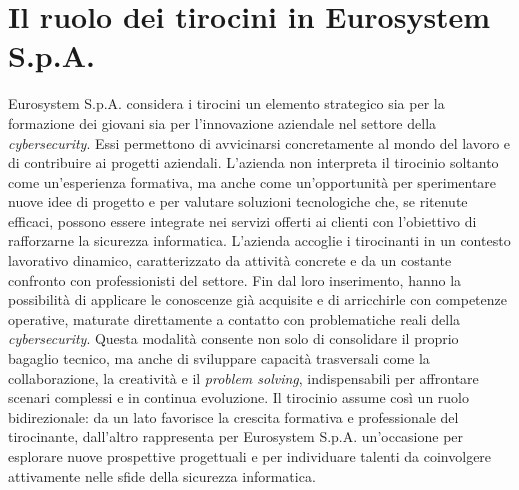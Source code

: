 \section{Il ruolo dei tirocini in Eurosystem S.p.A.}
Eurosystem S.p.A. considera i tirocini un elemento strategico sia per la formazione dei giovani sia per l'innovazione aziendale nel settore della \textit{cybersecurity}.  
Essi permettono di avvicinarsi concretamente al mondo del lavoro e di contribuire ai progetti aziendali.  
L'azienda non interpreta il tirocinio soltanto come un'esperienza formativa, ma anche come un'opportunità per sperimentare nuove idee di progetto e per valutare soluzioni tecnologiche che, se ritenute efficaci, possono essere integrate nei servizi offerti ai clienti con l'obiettivo di rafforzarne la sicurezza informatica.  
L'azienda accoglie i tirocinanti in un contesto lavorativo dinamico, caratterizzato da attività concrete e da un costante confronto con professionisti del settore.  
Fin dal loro inserimento, hanno la possibilità di applicare le conoscenze già acquisite e di arricchirle con competenze operative, maturate direttamente a contatto con problematiche reali della \textit{cybersecurity}.  
Questa modalità consente non solo di consolidare il proprio bagaglio tecnico, ma anche di sviluppare capacità trasversali come la collaborazione, la creatività e il \textit{problem solving}, indispensabili per affrontare scenari complessi e in continua evoluzione.  
Il tirocinio assume così un ruolo bidirezionale: da un lato favorisce la crescita formativa e professionale del tirocinante, dall'altro rappresenta per Eurosystem S.p.A. un'occasione per esplorare nuove prospettive progettuali e per individuare talenti da coinvolgere attivamente nelle sfide della sicurezza informatica.  